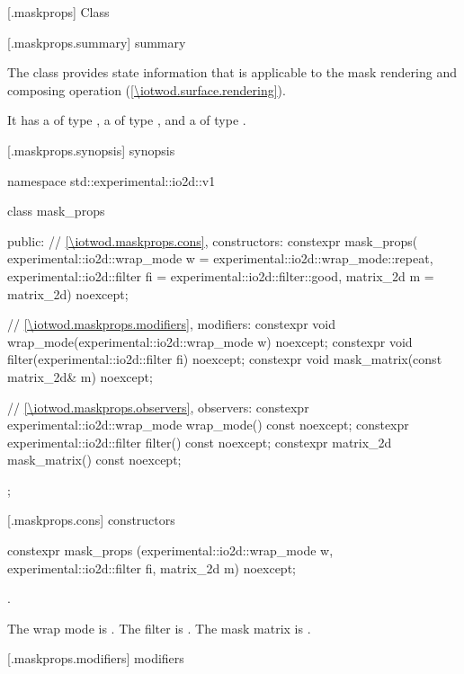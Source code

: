 
 [\iotwod.maskprops] {Class }

 [\iotwod.maskprops.summary] { summary}

\pnum
The  class provides state information that is applicable to the mask rendering and composing operation (\ref{\iotwod.surface.rendering}).

\pnum
It has a  of type , a  of type , and a  of type .

 [\iotwod.maskprops.synopsis] { synopsis}

\begin{codeblock}
namespace std::experimental::io2d::v1 {
  class mask_props {
  public:
    // \ref{\iotwod.maskprops.cons}, constructors:
    constexpr mask_props(
      experimental::io2d::wrap_mode w = experimental::io2d::wrap_mode::repeat,
      experimental::io2d::filter fi = experimental::io2d::filter::good,
      matrix_2d m = matrix_2d{}) noexcept;

    // \ref{\iotwod.maskprops.modifiers}, modifiers:
    constexpr void wrap_mode(experimental::io2d::wrap_mode w) noexcept;
    constexpr void filter(experimental::io2d::filter fi) noexcept;
    constexpr void mask_matrix(const matrix_2d& m) noexcept;

    // \ref{\iotwod.maskprops.observers}, observers:
    constexpr experimental::io2d::wrap_mode wrap_mode() const noexcept;
    constexpr experimental::io2d::filter filter() const noexcept;
    constexpr matrix_2d mask_matrix() const noexcept;
  };
}
\end{codeblock}

 [\iotwod.maskprops.cons] { constructors}

%
\begin{itemdecl}
constexpr mask_props (experimental::io2d::wrap_mode w, 
  experimental::io2d::filter fi, matrix_2d m) noexcept;
\end{itemdecl}
\begin{itemdescr}
\requires
{}.

\pnum
\effects
The wrap mode is . The filter is . The mask matrix is .
\end{itemdescr}

 [\iotwod.maskprops.modifiers] { modifiers}

